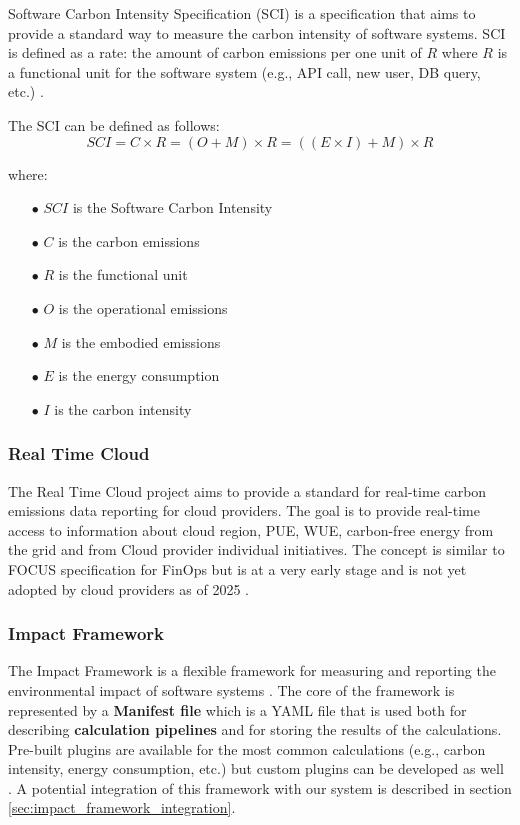 Software Carbon Intensity Specification (SCI) is a specification that aims to provide a standard way to measure the carbon intensity of software systems.
SCI is defined as a rate: the amount of carbon emissions per one unit of $R$ where $R$ is a functional unit for the software system (e.g., API call, new user, DB query, etc.) \cite{sci}.

The SCI can be defined as follows:
\[
SCI = C \times R = (O + M) \times R = ((E \times I) + M) \times R
\]

where:
\begin{itemize}[itemsep=0.2pt, topsep=1pt]
    \item[$\bullet$] $SCI$ is the Software Carbon Intensity
    \item[$\bullet$] $C$ is the carbon emissions
    \item[$\bullet$] $R$ is the functional unit
    \item[$\bullet$] $O$ is the operational emissions
    \item[$\bullet$] $M$ is the embodied emissions
    \item[$\bullet$] $E$ is the energy consumption
    \item[$\bullet$] $I$ is the carbon intensity
\end{itemize}

\subsubsection{Real Time Cloud}
\label{sec:real_time_cloud}

The Real Time Cloud project aims to provide a standard for real-time carbon emissions data reporting for cloud providers.
The goal is to provide real-time access to information about cloud region, PUE, WUE, carbon-free energy from the grid and from Cloud provider individual initiatives.
The concept is similar to FOCUS specification for FinOps but is at a very early stage and is not yet adopted by cloud providers as of 2025 \cite{real_time_cloud}.


\subsubsection{Impact Framework}
\label{sec:impact_framework}

The Impact Framework is a flexible framework for measuring and reporting the environmental impact of software systems \cite{impact_framework}.
The core of the framework is represented by a \textbf{Manifest file} which is a YAML file that is used both for describing \textbf{calculation pipelines} and for storing the results of the calculations.
Pre-built plugins are available for the most common calculations (e.g., carbon intensity, energy consumption, etc.) but custom plugins can be developed as well \cite{impact_framework}.
A potential integration of this framework with our system is described in section \ref{sec:impact_framework_integration}.


